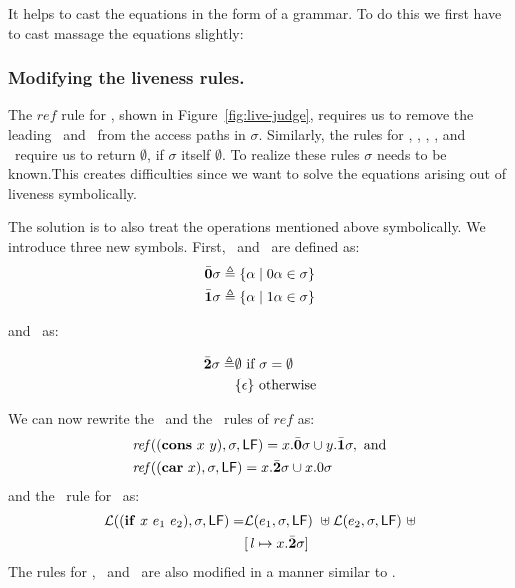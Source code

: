 \documentclass[9pt]{sigplanconf}
\begin{document}
It helps to cast the equations  in the form of a grammar. To
do  this  we  first  have  to  cast  massage  the  equations
slightly:

\subsubsection{Modifying the liveness rules.}

The      $\mathit{ref}$     rule      for     \CONS,      shown     in
Figure~\ref{fig:live-judge},  requires   us  to  remove   the  leading
\acar\ and \acdr\  from the access paths in  $\sigma$.  Similarly, the
rules for  \CAR, \CDR, \PRIM, \NULLQ,  and \SIF\ require  us to return
$\emptyset$, if $\sigma$ itself $\emptyset$.  To realize these rules
$\sigma$ needs to be known.This creates difficulties
since  we  want  to  solve  the  equations  arising  out  of  liveness
symbolically.

The  solution  is  to   also  treat  the  operations  mentioned  above
symbolically.  We  introduce three  new  symbols.   First, \bcar\  and
\bcdr\ are defined as:
\begin{align*}
 \bar{\mathbf{0}}\sigma &\triangleq \{\alpha \mid 0\alpha \in \sigma\}\\
 \bar{\mathbf{1}}\sigma &\triangleq \{\alpha \mid 1\alpha \in \sigma\}
\end{align*}

and \cbar\ as:

\begin{align*}
 \bar{\mathbf{2}}\sigma \triangleq& \emptyset~\mbox{if}~\sigma = \emptyset\\
                       & \{\epsilon\} ~\mbox{otherwise}
\end{align*}

We can now rewrite the \CONS\ and the \CAR\ rules of $\mathit{ref}$ as:
\begin{align*}
&\mathit{ref\/}((\mbox{$\mathbf{cons}$}~x~y),\sigma,\mathsf{LF})
= x.\bar{\mathbf{0}}\sigma \cup y.\bar{\mathbf{1}}\sigma  \label{eqn:mod-cons},~
\mbox{and} \\
&\mathit{ref\/}((\mbox{$\mathbf{car}$}~x),\sigma,\mathsf{LF})
          =   x.\bar{\mathbf{2}}\sigma \cup x.0\sigma
\end{align*}
and the \Lfunonly\ rule
for \SIF\ as:
\begin{align*}
\mathcal{L}((\mbox{$\mathbf{ if}$}~x~e_1~e_2),\sigma,\mathsf{LF}) =
                    &\mathcal{L}(e_1,\sigma,\mathsf{LF})~\uplus
        \mathcal{L}(e_2,\sigma,\mathsf{LF})~\uplus\\
        &[\,l \mapsto  x.\bar{\mathbf{2}} \sigma]
\end{align*}
The rules for \CDR, \PRIM\ and  \NULLQ\  are also modified in a manner
similar to \CAR. 
\end{document}
